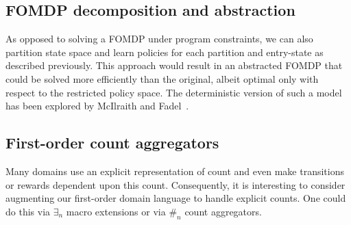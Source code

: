 \subsection{FOMDP decomposition and abstraction}

As opposed to solving a FOMDP under program constraints, we can also
partition state space and learn policies for each partition and
entry-state as described previously.  This approach would result in an
abstracted FOMDP that could be solved more efficiently than the
original, albeit optimal only with respect to the restricted policy space.
The deterministic version of such a model has been explored by
McIlraith and Fadel~\cite{complexact}.


\subsection{First-order count aggregators}

Many domains use an explicit representation of
count and even make transitions or rewards dependent upon
this count.  Consequently, it is interesting to consider augmenting our
first-order domain language to handle explicit counts.  One
could do this via $\exists_n$ macro extensions or via
$\#_n$ count aggregators.

